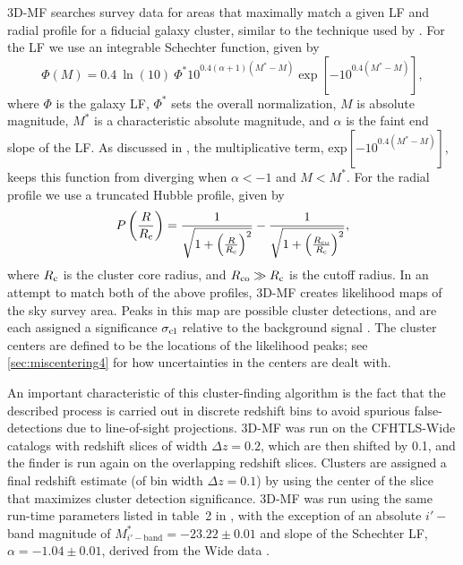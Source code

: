 \ac{3D-MF} searches survey data for areas that maximally match a given \ac{LF} and radial profile for a fiducial galaxy cluster, similar to the technique used by \citet{Postman96}.  For the \ac{LF} we use an integrable Schechter function, given by
\begin{equation}
\Phi(M)=0.4 \ \ln(10) \ \Phi^* 10^{0.4(\alpha + 1)(M^*-M)} \exp \left[ -10^{0.4(M^*-M)} \right],
\end{equation}
where $\Phi$ is the galaxy \ac{LF}, $\Phi^*$ sets the overall normalization, $M$ is absolute magnitude, $M^*$ is a characteristic absolute magnitude, and $\alpha$ is the faint end slope of the \ac{LF}. As discussed in \citet{Milkeraitis10}, the multiplicative term, exp$[-10^{0.4(M^{*}-M)}]$, keeps this function from diverging when $\alpha < -1$ and $M < M^*$. For the radial profile we use a truncated Hubble profile, given by
\begin{equation}
P \left ( \frac{R}{R_{\rm c}} \right )=\frac{1}{\sqrt{1+ \left ( \frac{R}{R_{\rm c}} \right ) ^2}} - \frac{1}{\sqrt{1+ \left ( \frac{R_{\rm co}}{R_{\rm c}} \right ) ^2}},
\end{equation}
where $R_{\rm c}$ is the cluster core radius, and $R_{\rm co} \gg R_{\rm c}$ is the cutoff radius. In an attempt to match both of the above profiles, \ac{3D-MF} creates likelihood maps of the sky survey area. Peaks in this map are possible cluster detections, and are each assigned a significance $\sigma_{\rm cl}$ relative to the background signal \citep[$\sigma_{\rm cl}$ is calculated using Equation 5 of][which the reader is referred to for more details]{Milkeraitis10}. The cluster centers are defined to be the locations of the likelihood peaks; see \autoref{sec:miscentering4} for how uncertainties in the centers are dealt with.

An important characteristic of this cluster-finding algorithm is the fact that the described process is carried out in discrete redshift bins to avoid spurious false-detections due to line-of-sight projections. \ac{3D-MF} was run on the \ac{CFHTLS}-Wide catalogs with redshift slices of width $\Delta z = 0.2$, which are then shifted by 0.1, and the finder is run again on the overlapping redshift slices. Clusters are assigned a final redshift estimate (of bin width $\Delta z = 0.1$) by using the center of the slice that maximizes cluster detection significance. \ac{3D-MF} was run using the same run-time parameters listed in table~2 in \citet{Milkeraitis10}, with the exception of an absolute $i'-$band magnitude of $M^*_{i'-\mathrm{band}}=-23.22 \pm 0.01$ and slope of the Schechter \ac{LF}, $\alpha=-1.04 \pm 0.01$, derived from the Wide data \citep{MMthesis11}.


